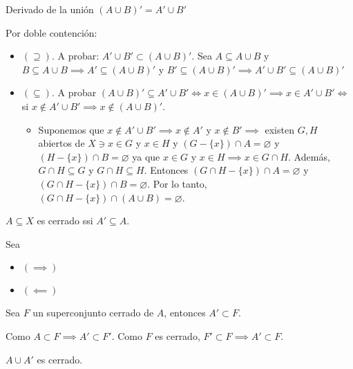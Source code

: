 \begin{prop}
    Derivado de la unión $(A\cup B)'=A'\cup B' $
    \begin{dem}
        Por doble contención:
        \begin{itemize}
            \item $(\supseteq)$. A probar: $A'\cup B'\subset (A\cup B)'$. Sea $A\subseteq A\cup B$ y $B\subseteq A\cup B\implies A'\subseteq (A\cup B)'$ y $B'\subseteq (A\cup B)'\implies A'\cup B'\subseteq (A\cup B)'$
            \item $(\subseteq)$. A probar $(A\cup B)'\subseteq A'\cup B'\iff x\in (A\cup B)'\implies x\in A'\cup B'\iff$ si $x\not\in A'\cup B'\implies x\not\in (A\cup B)'$.
            \begin{itemize}
                \item Suponemos que $x\not\in A'\cup B'\implies x\not\in A'$ y $x\not\in B'\implies$ existen $G,H$ abiertos de $X\ni x\in G$ y $x\in H$ y $(G-\{x\})\cap A=\varnothing$ y $(H-\{x\})\cap B=\varnothing $ ya que $x\in G$ y $x\in H\implies x\in G\cap H$. Además, $G\cap H\subseteq G$ y $G\cap H\subseteq H$. Entonces $(G\cap H-\{x\})\cap A=\varnothing$ y $(G\cap H-\{x\})\cap B =\varnothing$. Por lo tanto, $(G\cap H-\{x\})\cap (A\cup B)=\varnothing$. 
            \end{itemize}
        \end{itemize}
    \end{dem}
\end{prop}
\begin{prop}
    $A\subseteq X$ es cerrado ssi $A'\subseteq A$.
    \begin{dem}
        Sea
        \begin{itemize}
            \item $(\implies)$
            \item $(\impliedby)$
        \end{itemize}
    \end{dem}
\end{prop}

\begin{prop}
    Sea $F$ un superconjunto cerrado de $A$, entonces $A'\subset F$. 
    \begin{dem}
        Como $A\subset F\implies A'\subset F'$. Como $F$ es cerrado, $F'\subset F\implies A'\subset F$.
    \end{dem}
\end{prop}

\begin{prop}
    $A\cup A'$ es cerrado. 
\end{prop}